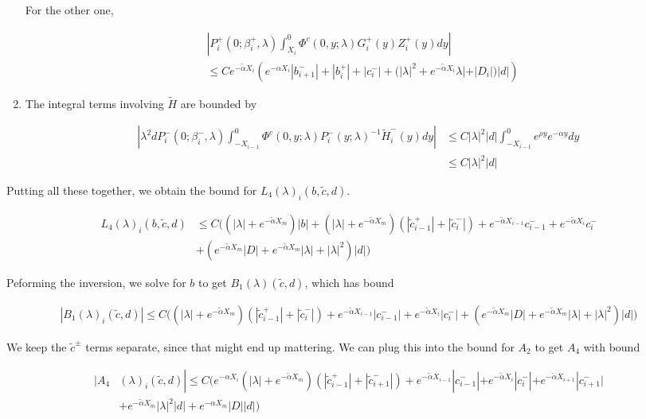 \documentclass[12pt]{article}
\begin{document}
\begin{enumerate}
For the other one,

\begin{align*}
&\left| P_i^+(0; \beta_i^+, \lambda) \int_{X_i}^0 \Phi^c(0, y; \lambda) G_i^+(y) Z_i^+(y) dy \right| \\
&\leq C e^{-\tilde{\alpha} X_i} \left( e^{-\alpha X_i} |b_{i+1}^-| + |b_i^+| + |c_i^-| + (|\lambda|^2 + e^{-\tilde{\alpha} X_i} \lambda| + |D_i|) |d| \right)
\end{align*}

\item The integral terms involving $\tilde{H}$ are bounded by

\begin{align*}
\left| \lambda^2 d P_i^-(0; \beta_i^-, \lambda) \int_{-X_{i-1}}^0 \Phi^c(0, y; \lambda) P_i^-(y; \lambda)^{-1} \tilde{H}_i^-(y) dy \right| &\leq C |\lambda|^2 |d| \int_{-X_{i-1}}^0 e^{\rho y} e^{-\alpha y} dy \\
&\leq C |\lambda|^2 |d|
\end{align*}

\end{enumerate}

Putting all these together, we obtain the bound for $L_4(\lambda)_i(b, \tilde{c}, d)$.

\begin{align*}
L_4(\lambda)_i(b, \tilde{c}, d) &\leq 
C\Big( (|\lambda| + e^{-\tilde{\alpha}X_m})|b| 
+ (|\lambda| + e^{-\tilde{\alpha}X_m})( |\tilde{c}_{i-1}^+| + |\tilde{c}_i^-|) + e^{-\tilde{\alpha} X_{i-1}} c_{i-1}^- + e^{-\tilde{\alpha} X_i} c_i^-\\
&+ ( e^{-\tilde{\alpha}X_m} |D| + e^{-\tilde{\alpha}X_m}|\lambda| + |\lambda|^2)|d| \Big)
\end{align*}

Peforming the inversion, we solve for $b$ to get $B_1(\lambda)(\tilde{c}, d)$, which has bound

\begin{align*}
|B_1(\lambda)_i(\tilde{c}, d)| \leq C\Big( 
(|\lambda| + e^{-\tilde{\alpha}X_m})( |\tilde{c}_{i-1}^+| + |\tilde{c}_i^-|)
+ e^{-\tilde{\alpha} X_{i-1}} |c_{i-1}^-| + e^{-\tilde{\alpha} X_i} |c_i^-| + ( e^{-\tilde{\alpha}X_m} |D| + e^{-\tilde{\alpha}X_m}|\lambda| + |\lambda|^2)|d| \Big)
\end{align*}

We keep the $\tilde{c}^\pm$ terms separate, since that might end up mattering. We can plug this into the bound for $A_2$ to get $A_4$ with bound

\begin{align*}
|A_4&(\lambda)_i(\tilde{c}, d)|
\leq C \Big( 
e^{-\alpha X_i} (|\lambda| + e^{-\tilde{\alpha}X_m})(|\tilde{c}_{i-1}^+| + |\tilde{c}_{i+1}^-|) + e^{-\tilde{\alpha}X_{i-1}}|c_{i-1}^-| + e^{-\tilde{\alpha}X_i}|c_i^-| + e^{-\tilde{\alpha}X_{i+1}}|c_{i+1}^-| \\
&+ e^{-\tilde{\alpha} X_m} |\lambda|^2|d| + e^{-\alpha X_m}|D||d| \Big)
\end{align*} 
\end{document}
